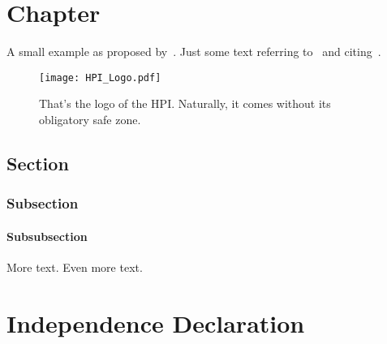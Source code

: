 \documentclass
[
	paper = a4,
    pagesize,
	12 pt,
	oneside,                       %
    open = right,
	DIV = calc,
	BCOR = 0 mm,                   %
	bibtotoc
]
{scrbook}
\begin{document}
\frontmatter







\mainmatter
\chapter{Chapter}

\lettrine[findent = -0.3 em, nindent = 0.7 em]{A}{} small example as proposed by~\citet{test}. Just some text referring to~ and citing~\citet{test2}.

\begin{figure}
    \centering
    \texttt{[image: HPI\_Logo.pdf]}
    \caption[HPI logo]{\label{fig:HPI}That’s the logo of the HPI. Naturally, it comes without its obligatory safe zone.}
\end{figure}

\section{Section}

\subsection{Subsection}

\subsubsection{Subsubsection}

\newpage
More text.
\newpage
Even more text.



\chapter*{Independence Declaration}

\end{document}
